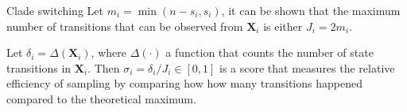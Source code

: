 \documentclass[newPxFont,numfooter,sectionpages]{beamer}
\begin{document}
\begin{frame}{Clade switching}
Let $m_i = \min(n - s_i, s_i)$, it can be shown that the maximum number of transitions that can be observed from $\boldsymbol X_i$ is either $J_i = 2 m_i$.

Let $\delta_i = \Delta(\boldsymbol X_i)$, where $\Delta(\cdot)$ a function that counts the number of state transitions in $\boldsymbol X_i$.
Then $\sigma_i = \delta_i/J_i \in [0, 1]$ is a score that measures the relative efficiency of sampling by comparing how how many transitions happened compared to the theoretical maximum. 
\end{frame}
\end{document}
